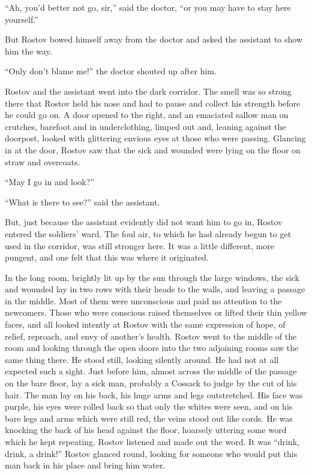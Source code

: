 ``Ah, you'd better not go, sir,'' said the doctor, ``or you may
have to stay here yourself.''

But Rostov bowed himself away from the doctor and asked the
assistant to show him the way.

``Only don't blame me!'' the doctor shouted up after him.

Rostov and the assistant went into the dark corridor. The smell
was so strong there that Rostov held his nose and had to pause
and collect his strength before he could go on. A door opened to
the right, and an emaciated sallow man on crutches, barefoot and
in underclothing, limped out and, leaning against the doorpost,
looked with glittering envious eyes at those who were
passing. Glancing in at the door, Rostov saw that the sick and
wounded were lying on the floor on straw and overcoats.

``May I go in and look?''

``What is there to see?'' said the assistant.

But, just because the assistant evidently did not want him to go
in, Rostov entered the soldiers' ward. The foul air, to which he
had already begun to get used in the corridor, was still stronger
here. It was a little different, more pungent, and one felt that
this was where it originated.

In the long room, brightly lit up by the sun through the large
windows, the sick and wounded lay in two rows with their heads to
the walls, and leaving a passage in the middle. Most of them were
unconscious and paid no attention to the newcomers. Those who
were conscious raised themselves or lifted their thin yellow
faces, and all looked intently at Rostov with the same expression
of hope, of relief, reproach, and envy of another's
health. Rostov went to the middle of the room and looking through
the open doors into the two adjoining rooms saw the same thing
there. He stood still, looking silently around. He had not at all
expected such a sight. Just before him, almost across the middle
of the passage on the bare floor, lay a sick man, probably a
Cossack to judge by the cut of his hair. The man lay on his back,
his huge arms and legs outstretched. His face was purple, his
eyes were rolled back so that only the whites were seen, and on
his bare legs and arms which were still red, the veins stood out
like cords. He was knocking the back of his head against the
floor, hoarsely uttering some word which he kept
repeating. Rostov listened and made out the word. It was ``drink,
drink, a drink!'' Rostov glanced round, looking for someone who
would put this man back in his place and bring him water.

